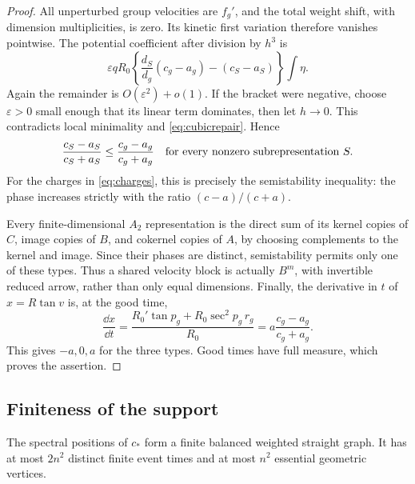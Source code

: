 \begin{proof}
All unperturbed group velocities are $f_g'$, and the total
weight shift, with dimension multiplicities, is zero. Its kinetic
first variation therefore vanishes pointwise. The potential
coefficient after division by $h^3$ is
\[
 \varepsilon qR_0
 \left\{\frac{d_S}{d_g}(c_g-a_g)-(c_S-a_S)\right\}\int\eta.
\]
Again the remainder is $O(\varepsilon^2)+o(1)$. If the bracket
were negative, choose $\varepsilon>0$ small enough that its
linear term dominates, then let $h\to0$. This contradicts local
minimality and \eqref{eq:cubicrepair}. Hence
\begin{equation}\label{eq:semistableslope}
 \frac{c_S-a_S}{c_S+a_S}\le\frac{c_g-a_g}{c_g+a_g}
 \quad\hbox{for every nonzero subrepresentation }S.
\end{equation}
For the charges in \eqref{eq:charges}, this is precisely the
semistability inequality: the phase increases strictly with the
ratio $(c-a)/(c+a)$.

Every finite-dimensional $A_2$ representation is the direct sum
of its kernel copies of $C$, image copies of $B$, and cokernel
copies of $A$, by choosing complements to the kernel and image.
Since their phases are distinct, semistability permits only one
of these types. Thus a shared velocity block is actually $B^m$,
with invertible reduced arrow, rather than only equal dimensions.
Finally, the derivative in $t$ of $x=R\tan v$ is, at the good
time,
\[
 \frac{\dd x}{\dd t}
 =\frac{R_0'\tan p_g+R_0\sec^2p_g\,r_g}{R_0}
 =a\frac{c_g-a_g}{c_g+a_g}.
\]
This gives $-a,0,a$ for the three types. Good times have full
measure, which proves the assertion.
\end{proof}

\subsection{Finiteness of the support}

\begin{proposition}\label{prop:finitesupport}
The spectral positions of $c_*$ form a finite balanced weighted
straight graph. It has at most $2n^2$ distinct finite event times
and at most $n^2$ essential geometric vertices.
\end{proposition}

